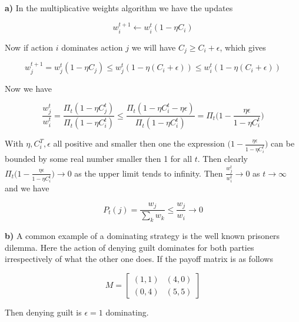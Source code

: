 \textbf{a)} In the multiplicative weights algorithm we have the updates

$$
w_i^{t+1} \leftarrow w_i^t (1- \eta C_i)
$$

Now if action $i$ dominates action $j$ we will have $C_j \ge C_i + \epsilon$, which gives

$$
w_j^{t+1} =  w_j^t (1- \eta C_j) \le w_j^t (1- \eta (C_i + \epsilon)) \le w_i^t (1- \eta (C_i + \epsilon))
$$

Now we have

$$
\frac{w_j^t}{w_i^t} = \frac{ \Pi_t (1- \eta C_j^t)}{\Pi_t (1- \eta C_i^t)} \le \frac{ \Pi_t (1- \eta C_i^t - \eta \epsilon)}{\Pi_t (1- \eta C_i^t)} = \Pi_t \bigg(1- \frac{\eta \epsilon}{1- \eta C_i^t} \bigg)
$$

With $\eta, C_i^T, \epsilon$ all positive and smaller then one the expression $\big(1- \frac{\eta \epsilon}{1- \eta C_i^t} \big)$ can be bounded by some real number smaller then 1 for all $t$. Then clearly $\Pi_t \big(1- \frac{\eta \epsilon}{1- \eta C_i^t} \big) \rightarrow 0$ as the upper limit tends to infinity. Then $\frac{w_j^t}{w_i^t} \rightarrow 0$ as $t \rightarrow \infty$ and we have

$$
P_t(j) = \frac{w_j}{\sum_k w_k} \le \frac{w_j}{w_i} \rightarrow 0
$$


\textbf{b)} A common example of a dominating strategy is the well known prisoners dilemma. Here the action of denying guilt dominates for both parties irrespectively of what the other one does. If the payoff matrix is as follows

$$
   M=
  \left[ {\begin{array}{cc}
   (1,1) & (4,0) \\ (0,4) & (5,5) \end{array} } \right]
$$

Then denying guilt is $\epsilon=1$ dominating.


